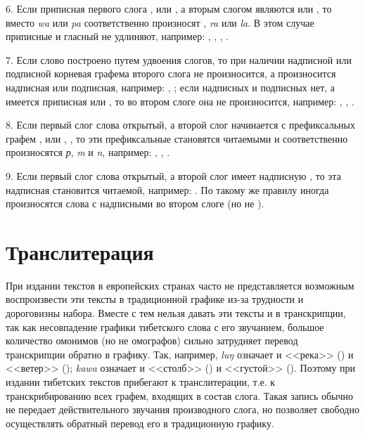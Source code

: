 6. Если приписная первого слога ,  или , а вторым слогом являются  или , то вместо \textit{wa} или \textit{pa} соответственно произносят \textrtailn{}, \textit{ra} или \textit{la}. В этом случае приписные  и гласный не удлиняют, например:
,
,
,
.

7.	Если слово построено путем удвоения слогов, то при наличии надписной или подписной корневая графема второго слога не произносится, а произносится надписная или подписная, например:
, 
;
если надписных и подписных нет, а имеется приписная  или , то во втором слоге она не произносится, например:
,
,
.

8. Если первый слог слова открытый, а второй слог начинается с префиксальных графем ,  или , , то эти префиксальные становятся читаемыми и соответственно произносятся \textit{р}, \textit{m} и \textit{n}, например:
,
,
.

9. Если первый слог слова открытый, а второй слог имеет надписную , то эта надписная становится читаемой, например: . По такому же правилу иногда произносятся слова с надписными  во втором слоге (но не ).

\section{Транслитерация}

При издании текстов в европейских странах часто не представляется возможным воспроизвести эти тексты в традиционной графике из-за трудности и дороговизны набора. Вместе с тем нельзя давать эти тексты и в транскрипции, так как несовпадение графики тибетского слова с его звучанием, большое количество омонимов (но не омографов) сильно затрудняет перевод транскрипции обратно в графику. Так, например, \textit{lu{\unifont ŋ}\toneR} означает и <<река>> () и <<ветер>> (); \textit{ka\toneR{}wa\toneR} означает и <<столб>> () и <<густой>> (). Поэтому при издании тибетских текстов прибегают к транслитерации, т.е. к транскрибированию всех графем, входящих в состав слога. Такая запись обычно не передает действительного звучания производного слога, но позволяет свободно осуществлять обратный перевод его в традиционную графику.


